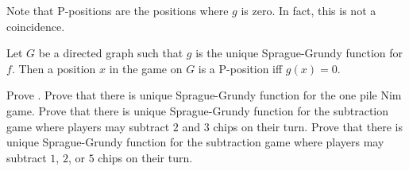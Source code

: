Note that P-positions are the positions where $g$ is zero. In fact,
this is not a coincidence.
\begin{theorem}
\label{theorem:grundy-to-np}
    Let $G$ be a directed graph such that $g$ is the unique Sprague-Grundy
    function for $f$.
    Then a position $x$ in the game on $G$ is a P-position iff $g(x) = 0$.
\end{theorem}


\begin{chapterendexercises}
    \exercise Prove .
    \exercise Prove that there is unique Sprague-Grundy function for the one pile
        Nim game.
    \exercise Prove that there is unique Sprague-Grundy function for the
        subtraction game where players may subtract $2$ and $3$ chips on their
        turn.
    \exercise
       Prove that there is unique Sprague-Grundy function for the subtraction
       game where players may subtract $1$, $2$, or $5$ chips
       on their turn.
\end{chapterendexercises}
